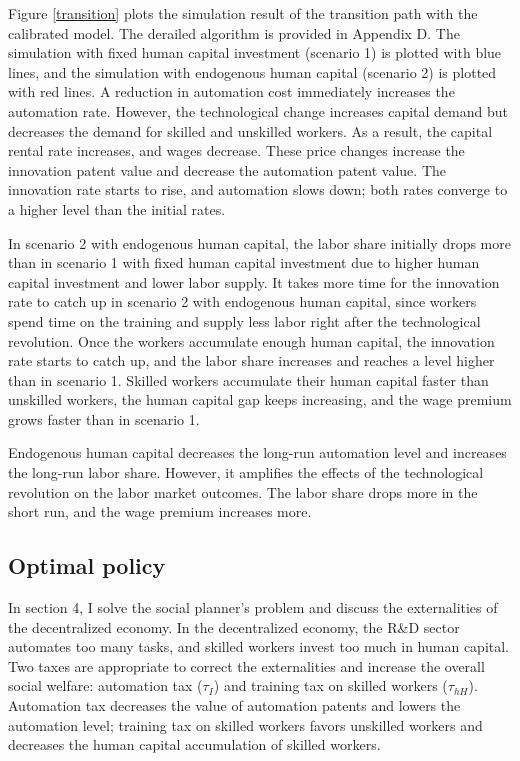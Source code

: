 \documentclass[12pt]{article}
\begin{document}
Figure \ref{transition} plots the simulation result of the transition path with the calibrated model. The derailed algorithm is provided in Appendix D. The simulation with fixed human capital investment (scenario 1) is plotted with blue lines, and the simulation with endogenous human capital (scenario 2) is plotted with red lines. A reduction in automation cost immediately increases the automation rate. However, the technological change increases capital demand but decreases the demand for skilled and unskilled workers. As a result, the capital rental rate increases, and wages decrease. These price changes increase the innovation patent value and decrease the automation patent value. The innovation rate starts to rise, and automation slows down; both rates converge to a higher level than the initial rates. 

In scenario 2 with endogenous human capital, the labor share initially drops more than in scenario 1 with fixed human capital investment due to higher human capital investment and lower labor supply. It takes more time for the innovation rate to catch up in scenario 2 with endogenous human capital, since workers spend time on the training and supply less labor right after the technological revolution. Once the workers accumulate enough human capital, the innovation rate starts to catch up, and the labor share increases and reaches a level higher than in scenario 1. Skilled workers accumulate their human capital faster than unskilled workers, the human capital gap keeps increasing, and the wage premium grows faster than in scenario 1.

Endogenous human capital decreases the long-run automation level and increases the long-run labor share. However, it amplifies the effects of the technological revolution on the labor market outcomes. The labor share drops more in the short run, and the wage premium increases more. 

\subsection{Optimal policy}
In section 4, I solve the social planner's problem and discuss the externalities of the decentralized economy. In the decentralized economy, the R\&D sector automates too many tasks, and skilled workers invest too much in human capital. Two taxes are appropriate to correct the externalities and increase the overall social welfare: automation tax ($\tau_I$) and training tax on skilled workers ($\tau_{hH}$). Automation tax decreases the value of automation patents and lowers the automation level; training tax on skilled workers favors unskilled workers and decreases the human capital accumulation of skilled workers. 
\end{document}
